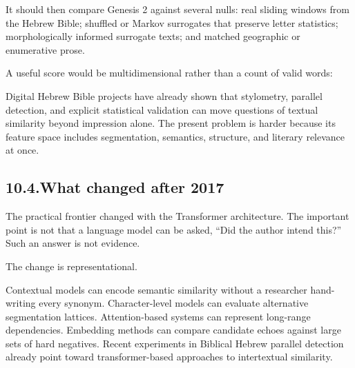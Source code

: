 It should then compare Genesis 2 against several nulls: real sliding windows from the Hebrew Bible; shuffled or Markov surrogates that preserve letter statistics; morphologically informed surrogate texts; and matched geographic or enumerative prose.

A useful score would be multidimensional rather than a count of valid words:


Digital Hebrew Bible projects have already shown that stylometry, parallel detection, and explicit statistical validation can move questions of textual similarity beyond impression alone.\cite{Roorda2015,NaaijerRoorda2016,YoffeEtAl2023}  The present problem is harder because its feature space includes segmentation, semantics, structure, and literary relevance at once.

\subsection*{10.4.\quad What changed after 2017}

The practical frontier changed with the Transformer architecture.\cite{VaswaniEtAl2017}  The important point is not that a language model can be asked, ``Did the author intend this?''  Such an answer is not evidence.

The change is representational.

Contextual models can encode semantic similarity without a researcher hand-writing every synonym.  Character-level models can evaluate alternative segmentation lattices.  Attention-based systems can represent long-range dependencies.  Embedding methods can compare candidate echoes against large sets of hard negatives.  Recent experiments in Biblical Hebrew parallel detection already point toward transformer-based approaches to intertextual similarity.\cite{Smiley2025}

